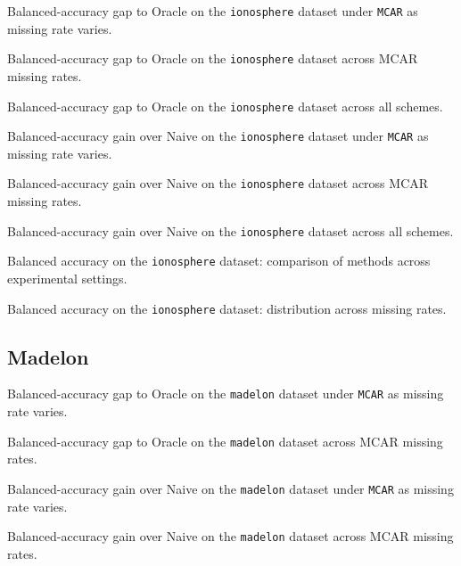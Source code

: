 \documentclass[8pt,a4paper]{extarticle}
\begin{document}
{Balanced-accuracy gap to Oracle on the \texttt{ionosphere} dataset under \texttt{MCAR} as missing rate varies.}

{Balanced-accuracy gap to Oracle on the \texttt{ionosphere} dataset across MCAR missing rates.}

{Balanced-accuracy gap to Oracle on the \texttt{ionosphere} dataset across all schemes.}

{Balanced-accuracy gain over Naive on the \texttt{ionosphere} dataset under \texttt{MCAR} as missing rate varies.}

{Balanced-accuracy gain over Naive on the \texttt{ionosphere} dataset across MCAR missing rates.}

{Balanced-accuracy gain over Naive on the \texttt{ionosphere} dataset across all schemes.}

{Balanced accuracy on the \texttt{ionosphere} dataset: comparison of methods across experimental settings.}

{Balanced accuracy on the \texttt{ionosphere} dataset: distribution across missing rates.}

\clearpage
\subsection{Madelon}

{Balanced-accuracy gap to Oracle on the \texttt{madelon} dataset under \texttt{MCAR} as missing rate varies.}

{Balanced-accuracy gap to Oracle on the \texttt{madelon} dataset across MCAR missing rates.}

{Balanced-accuracy gain over Naive on the \texttt{madelon} dataset under \texttt{MCAR} as missing rate varies.}

{Balanced-accuracy gain over Naive on the \texttt{madelon} dataset across MCAR missing rates.}
\end{document}
